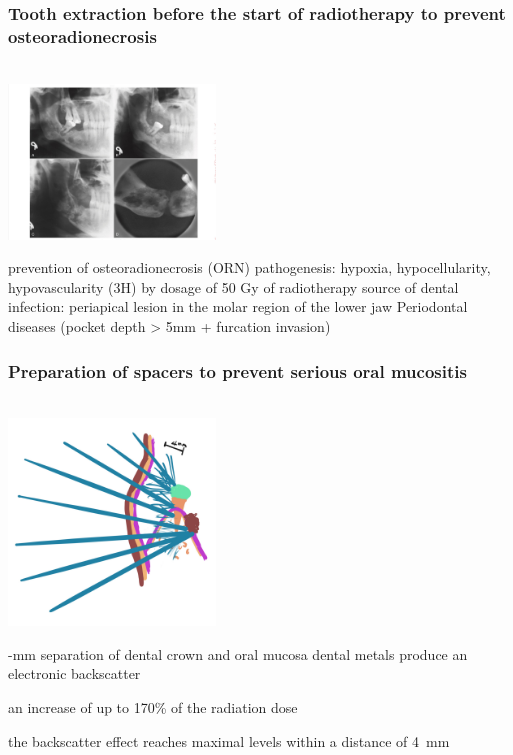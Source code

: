 \documentclass[
paper=landscape,
paper=160mm:90mm, %
fontsize=11pt, %
pagesize, %
parskip=half-, %
]{scrartcl} %
\newenvironment{WrapText1}[3][r]
{\wrapfigure[#2]{#1}{#3}}
{\endwrapfigure}
\newcommand{\wrapr}[6]{
\begin{minipage}{\linewidth}\mbox{}\\
\vspace{#1}
\begin{WrapText1}{#2}{#3}
\vspace{#4}#5\end{WrapText1}#6
\end{minipage}}
\theoremstyle{mythmstyle} %
\begin{document}
\subsubsection{Tooth extraction before the start of radiotherapy to prevent osteoradionecrosis}
\wrapr{-1mm}{7}{9cm}{-15mm}
{%
\includegraphics[width=5.5cm]{mandible_ORN.jpg}
} %
{%
\begin{outline}
\0 prevention of osteoradionecrosis (ORN)
\1 pathogenesis: hypoxia, hypocellularity, hypovascularity (3H) by dosage of 50 Gy of radiotherapy
\1 source of dental infection: 
    \2 periapical lesion in the molar region of the lower jaw
    \2 Periodontal diseases (pocket depth > 5mm + furcation invasion)
\end{outline}
} %
\clearpage

\subsubsection{Preparation of spacers to prevent serious oral mucositis}
\wrapr{-1mm}{7}{9cm}{-10mm}
{%
\includegraphics[width=5.5cm]{backscatter.jpg}
} %
{%
\begin{outline}
\0 5-mm separation of dental crown and oral mucosa
\1 dental metals produce an electronic backscatter

\1 an increase of up to 170\% of the radiation dose

\1 the backscatter effect reaches maximal levels within a distance of 4 mm
\end{outline}
} %
\clearpage
\end{document}
